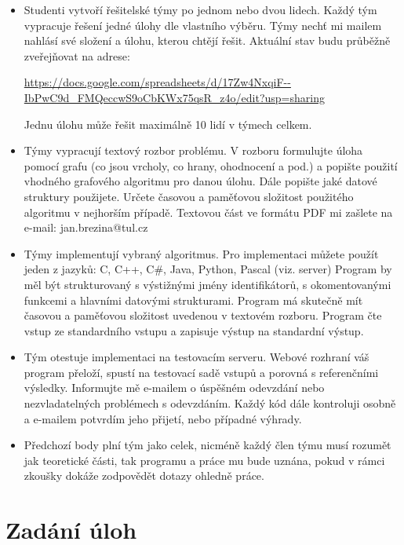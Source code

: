 \documentclass[a4paper,10pt]{article}
\begin{document}
  \begin{itemize}
  \item   Studenti vytvoří řešitelské týmy po jednom nebo dvou lidech. Každý tým vypracuje řešení jedné úlohy dle vlastního výběru. Týmy nechť mi mailem nahlásí své složení a úlohu, kterou chtějí řešit.  Aktuální stav budu průběžně zveřejňovat na adrese:
 
 \url{https://docs.google.com/spreadsheets/d/17Zw4NxqiF--IbPwC9d_FMQeccwS9oCbKWx75qsR_z4o/edit?usp=sharing}
 
 Jednu úlohu může řešit maximálně 10 lidí v týmech celkem.

  \item Týmy vypracují textový rozbor problému. V rozboru formulujte úloha  pomocí grafu (co jsou vrcholy, co hrany, ohodnocení a pod.)
  a popište použití vhodného grafového algoritmu pro danou úlohu. Dále popište jaké datové struktury použijete. 
  Určete časovou a paměťovou složitost použitého algoritmu v nejhorším případě. 
  Textovou část ve formátu PDF mi zašlete na e-mail: jan.brezina@tul.cz 
         

  \item  Týmy implementují vybraný algoritmus. Pro implementaci můžete použít jeden z jazyků: C, C++, C\#, Java, Python, Pascal (viz. server)
   Program by měl být strukturovaný s výstižnými jmény identifikátorů, s okomentovanými funkcemi a hlavními datovými strukturami. 
   Program má skutečně mít časovou a paměťovou složitost uvedenou v textovém rozboru. Program čte vstup ze standardního vstupu a zapisuje výstup na standardní výstup.
  
  \item  Tým otestuje implementaci na testovacím serveru. Webové rozhraní váš program přeloží, 
        spustí na testovací sadě vstupů a porovná s referenčními výsledky. Informujte mě e-mailem o úspěšném odevzdání nebo nezvladatelných problémech 
        s odevzdáním. Každý kód dále kontroluji osobně a e-mailem potvrdím jeho přijetí, nebo případné výhrady.  

  \item  Předchozí body plní tým jako celek, nicméně každý člen týmu musí rozumět jak teoretické části, tak programu a práce mu bude
         uznána, pokud v rámci zkoušky dokáže zodpovědět dotazy ohledně práce.
 \end{itemize}

\section{Zadání úloh}
\end{document}
